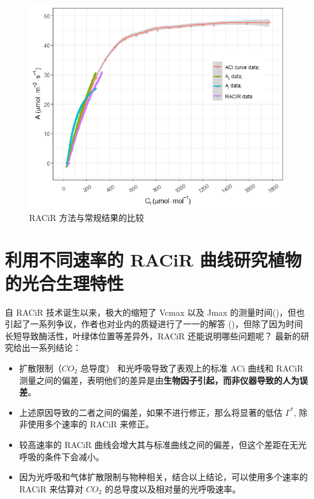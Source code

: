 \documentclass[
]{krantz}
\begin{document}
\begin{figure}
\includegraphics[width=1\linewidth]{images/racir} \caption{RACiR 方法与常规结果的比较}\label{fig:racir}
\end{figure}

\cleardoublepage

\hypertarget{multirate-racir}{%
\section{利用不同速率的 RACiR 曲线研究植物的光合生理特性}\label{multirate-racir}}

自 RACiR 技术诞生以来，极大的缩短了 Vcmax 以及 Jmax 的测量时间(\citet{stinziano2017})，但也引起了一系列争议，作者也对业内的质疑进行了一一的解答 (\citet{stinziano2018})，但除了因为时间长短导致酶活性，叶绿体位置等差异外，RACiR 还能说明哪些问题呢？\citet{stinziano2019} 最新的研究给出一系列结论：

\begin{itemize}
\item
  扩散限制（\(CO_2\) 总导度） 和光呼吸导致了表观上的标准 ACi 曲线和 RACiR 测量之间的偏差，表明他们的差异是由\textbf{生物因子引起，而非仪器导致的人为误差}。
\item
  上述原因导致的二者之间的偏差，如果不进行修正，那么将显著的低估 \(\Gamma^*\), 除非使用多个速率的 RACiR 来修正。
\item
  较高速率的 RACiR 曲线会增大其与标准曲线之间的偏差，但这个差距在无光呼吸的条件下会减小。
\item
  因为光呼吸和气体扩散限制与物种相关，结合以上结论，可以使用多个速率的 RACiR 来估算对 \(CO_2\) 的总导度以及相对量的光呼吸速率。
\end{itemize}
\end{document}
